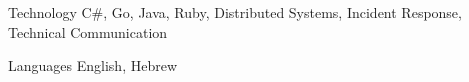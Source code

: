 

\begin{cvskills}

  \cvskill
    {Technology} %
    {C\#, Go, Java, Ruby, Distributed Systems, Incident Response, Technical Communication}

  \cvskill
    {Languages} %
    {English, Hebrew} %

\end{cvskills}
